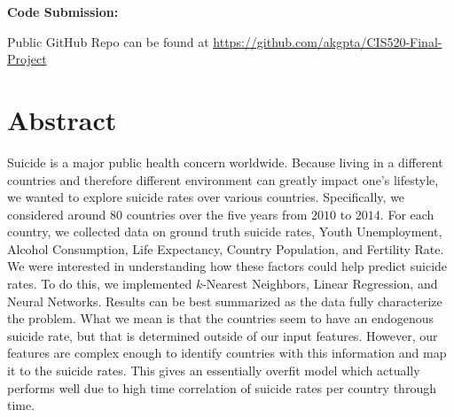 \documentclass{article}
\begin{document}
\vspace{12pt}

\textbf{Code Submission:}

\normalsize{Public GitHub Repo can be found at \href{https://github.com/akgpta/CIS520-Final-Project}{https://github.com/akgpta/CIS520-Final-Project}}



\newpage
\tableofcontents
\newpage

\section{Abstract}
Suicide is a major public health concern worldwide. Because living in a different countries and therefore different environment can greatly impact one's lifestyle, we wanted to explore suicide rates over various countries. Specifically, we considered around $80$ countries over the five years from $2010$ to $2014$. For each country, we collected data on ground truth suicide rates, Youth Unemployment, Alcohol Consumption, Life Expectancy, Country Population, and Fertility Rate. We were interested in understanding how these factors could help predict suicide rates. To do this, we implemented $k$-Nearest Neighbors, Linear Regression, and Neural Networks. Results can be best summarized as the data fully characterize the problem. What we mean is that the countries seem to have an endogenous suicide rate, but that is determined outside of our input features. However, our features are complex enough to identify countries with this information and map it to the suicide rates. This gives an essentially overfit model which actually performs well due to high time correlation of suicide rates per country through time. 
\end{document}
